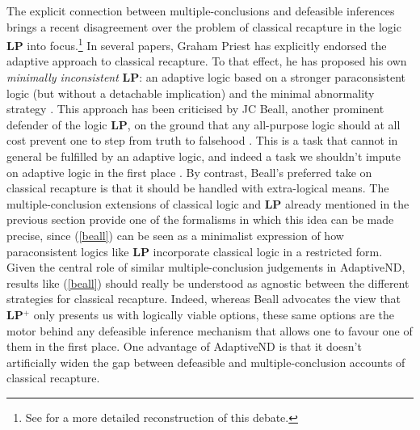 \documentclass[]{article}
\begin{document}
The explicit connection between multiple-conclusions and defeasible inferences brings a recent disagreement over the problem of classical recapture in the logic \textbf{LP} into focus.\footnote{See \cite[18ff]{Allo:Theoria:2015} for a more detailed reconstruction of this debate.} In several papers, Graham Priest has explicitly endorsed the adaptive approach to classical recapture. To that effect, he has proposed his own \emph{minimally inconsistent} \textbf{LP}: an adaptive logic based on a stronger paraconsistent logic (but without a detachable implication) and the minimal abnormality strategy \cite{GP:LPm}. This approach has been criticised by JC Beall, another prominent defender of the logic \textbf{LP}, on the ground that any all-purpose logic should at all cost prevent one to step from truth to falsehood \cite{Beall01072012}. This is a task that cannot in general be fulfilled by an adaptive logic, and indeed a task we shouldn't impute on adaptive logic in the first place \cite{Priest01102012}. By contrast, Beall's preferred take on classical recapture is that it should be handled with extra-logical means. The multiple-conclusion extensions of classical logic and \textbf{LP} already mentioned in the previous section provide one of the formalisms in which this idea can be made precise, since (\ref{beall}) can be seen as a minimalist expression of how paraconsistent logics like \textbf{LP} incorporate classical logic in a restricted form. Given the central role of similar multiple-conclusion judgements in \textsf{AdaptiveND}, results like (\ref{beall}) should really be understood as agnostic between the different strategies for classical recapture. Indeed, whereas Beall advocates the view that \textbf{LP$^+$} only presents us with logically viable options, these same options are the motor behind any defeasible inference mechanism that allows one to favour one of them in the first place. One advantage of \textsf{AdaptiveND} is that it doesn't artificially widen the gap between defeasible and multiple-conclusion accounts of classical recapture.
\end{document}
